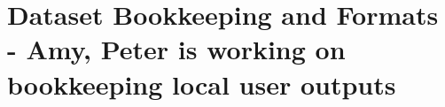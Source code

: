 \section{Dataset Bookkeeping and Formats - Amy, Peter is working on bookkeeping local user outputs}
\begin{comment}
S. V. Chekanov, G. Gavalian, and N. A. Graf, “Jas4pp - a Data-Analysis Framework for Physics and Detector Studies”, arXiv:2011.05329 [physics.comp-ph ]] (pdf).~\cite{Chekanov:2020bja}
 - Java-based programs make distribution and installation on Windows, Linux, Mac easy
 - They mention excellent library support but it's not clear what libraries?
 - based on JAIDA, the Java implementation of AIDA (Abstract Interfaces for Data Analysis)
 - supports  LCIO [21] I/O library developed for ILC studies. Some examples of reading LCIO files using Jython code can be found in Appendix A.2 (and in the following sections).
 - HiPO (High Performance Output data, from JLAB, has an XROOTD driver)
 - ProMC, ProIO
 - stores outputs with Java serialization method, can be binary format or XML 
 
Jim Pivarski, Eduardo Rodrigues, Kevin Pedro, Oksana Shadura, Benjamin Krikler, Graeme A. Stewart. ”HL-LHC Computing Review Stage 2, Common Software Projects: Data Science Tools for Analysis”, arXiv:2202.02194 [physics.data-an] (pdf).~\cite{arxiv.2202.02194}
- physicists are motivated to contribute
- interoperability is key to supporting scientists
- ROOT is the columnar data store that will always be with us.  But ROOT files might some day contain more than TTrees, in particular RNTuple is under active development
- Apache Arrow, Apache Parquet now offer similary-efficient columnar storage and tese format are used by some collaborations
- Why not databases, this is an obvious match to our access problems!  See Striped, ServiceX, SkyhookDM, Coffea's columnservice, Tiled

J. V. Bennett, J. Guilliams, M. Hernandez Villanueva, D. E. Jaffe, P. J. Laycock, A. Panta, C. Serfon, I. Ueda. ”Belle II grid-based user analysis”, arXiv:2203.07564 [hep-ex] (pdf).~\cite{Bennett:2022gyi}
- ROOT files for storage and analysis
- about 60 PB needed for all data (skimmed and simulation, not saving "original" data?)
- collaboration feels that this is feasible storage-wise (although large) but that 10^12 events represents a data management challenge
  -- Using Rucio for job submission and file resolution
  -- Concerns about scalability
- central question is: how do we fund what's needed for analysis after the experiment?
  -- storage, computing, and networking services all cost money.  In particular, grid solutions require security upkeep and therefore may not be feasible long-term
  -- software must remain usable (perhaps through containers)
  -- float the idea of central facilities that provide needed services to experiments


\end{comment}
